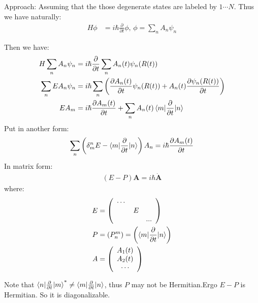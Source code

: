 \documentclass{article}
\numberwithin{equation}{subsection} %
\theoremstyle{definition}
\begin{document}
    Approach:
    Assuming that the those degenerate states are labeled by $1\cdots N$. 
    Thus we have naturally:
	\begin{align}
            H\phi &=i\hbar\frac{\partial}{\partial t}\phi\text{,  }
        \phi = \sum_n A_n \psi_n
    \end{align}
    
    Then we have:
    \begin{align}
    H \sum_n A_n \psi_n &=i\hbar\frac{\partial }{\partial t}
	  	\sum_n A_n(t) \psi_n(R(t)) \nonumber\\
	\sum_n E A_n \psi_n&=i\hbar\sum_n
		\left(
		\frac{\partial A_n(t)}{\partial t}\psi_n(R(t))+
		A_n(t)\frac{\partial \psi_n(R(t))}{\partial t}
		\right) \nonumber\\
	E A_m &=i\hbar
		\frac{\partial A_m(t)}{\partial t}
		+\sum_n A_n(t)\braket{m|\frac{\partial }{\partial t}|n}
    \end{align}
    Put in another form:
    $$
    \sum_n \left(\delta^n_m E
        - \braket{m| \frac{\partial}{\partial t}|n} \right) A_n
        =
    i\hbar \frac{\partial A_m(t)}{\partial t}
    $$
    In matrix form:
    \begin{align}
            (E - P) \mathbf{A} = i\hbar \dot{\mathbf{A}}
    \end{align}
    where:
    \begin{align}
        E &= \left(
        \begin{array}{ccc}
         \cdots   &     &   \\
              & E &   \\
             &    & \text{...} \\
        \end{array}
        \right) \\
        P &= (P^m_n) = \left(
        \braket{m| \frac{\partial}{\partial t}|n}\right)\\
        A &= \left(\begin{array}{c}
            A_1(t) \\
            A_2(t) \\
            \cdots \\
        \end{array}\right)
    \end{align}
    
    Note that $\braket{n| \frac{\partial}{\partial t}|m}^* \neq
    \braket{m| \frac{\partial}{\partial t} |n}$, thus $P$ may not be
    Hermitian.Ergo $E-P$ is Hermitian. So it is diagonalizable.
\end{document}
